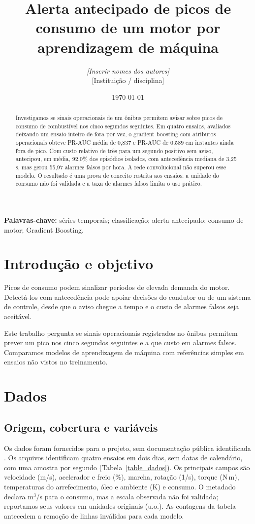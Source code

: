 \documentclass[10pt,a4paper]{article}
\title{Alerta antecipado de picos de consumo de um motor por aprendizagem de máquina}
\author{\textit{[Inserir nomes dos autores]}\\
\small [Instituição / disciplina]}
\date{\today}
\begin{document}
\maketitle

\begin{abstract}
Investigamos se sinais operacionais de um ônibus permitem avisar sobre picos de consumo de combustível nos cinco segundos seguintes. Em quatro ensaios, avaliados deixando um ensaio inteiro de fora por vez, o gradient boosting com atributos operacionais obteve PR-AUC média de 0{,}837 e PR-AUC de 0{,}589 em instantes ainda fora de pico. Com custo relativo de três para um segundo positivo sem aviso, antecipou, em média, 92{,}0\% dos episódios isolados, com antecedência mediana de 3{,}25 s, mas gerou 55{,}97 alarmes falsos por hora. A rede convolucional não superou esse modelo. O resultado é uma prova de conceito restrita aos ensaios: a unidade do consumo não foi validada e a taxa de alarmes falsos limita o uso prático.
\end{abstract}

\noindent\textbf{Palavras-chave:} séries temporais; classificação; alerta antecipado; consumo de motor; Gradient Boosting.

\section{Introdução e objetivo}
Picos de consumo podem sinalizar períodos de elevada demanda do motor. Detectá-los com antecedência pode apoiar decisões do condutor ou de um sistema de controle, desde que o aviso chegue a tempo e o custo de alarmes falsos seja aceitável.

Este trabalho pergunta se sinais operacionais registrados no ônibus permitem prever um pico nos cinco segundos seguintes e a que custo em alarmes falsos. Comparamos modelos de aprendizagem de máquina com referências simples em ensaios não vistos no treinamento.


\section{Dados}
\subsection{Origem, cobertura e variáveis}
Os dados foram fornecidos para o projeto, sem documentação pública identificada \cite{dadosprojeto}. Os arquivos identificam quatro ensaios em dois dias, sem datas de calendário, com uma amostra por segundo (Tabela~\ref{table_dados}). Os principais campos são velocidade (m/s), acelerador e freio (\%), marcha, rotação (1/s), torque (N\,m), temperaturas do arrefecimento, óleo e ambiente (K) e consumo. O metadado declara m$^3$/s para o consumo, mas a escala observada não foi validada; reportamos seus valores em unidades originais (u.o.). As contagens da tabela antecedem a remoção de linhas inválidas para cada modelo.
\end{document}
